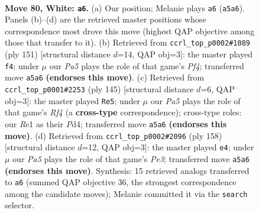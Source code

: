 \documentclass[11pt]{article}
\begin{document}
\clearpage

\begin{figure}[p]\centering
\begin{subfigure}{0.46\textwidth}\centering
\resizebox{\linewidth}{!}{%
\newchessgame
\chessboard[
  setfen={8/7k/1P5n/P7/8/1K6/7r/4R3 w - - 23 80},
  showmover=false,
  pgfstyle=straightmove, color=movearrow, markmove={a5-a6}
]}
\caption{}
\end{subfigure}\hfill
\begin{subfigure}{0.46\textwidth}\centering
\resizebox{\linewidth}{!}{%
\newchessgame
\chessboard[
  setfen={7R/8/6k1/5p2/3P2p1/r7/5K2/5N2 b - - 1 76},
  showmover=false,
  pgfstyle=straightmove, color=movearrow, markmove={f5-f4}
]}
\caption{}
\end{subfigure}
\\[4pt]
\begin{subfigure}{0.46\textwidth}\centering
\resizebox{\linewidth}{!}{%
\newchessgame
\chessboard[
  setfen={8/2k5/8/5rp1/3p4/8/3K4/1RN5 b - - 1 73},
  showmover=false,
  pgfstyle=straightmove, color=movearrow, markmove={f5-e5}
]}
\caption{}
\end{subfigure}\hfill
\begin{subfigure}{0.46\textwidth}\centering
\resizebox{\linewidth}{!}{%
\newchessgame
\chessboard[
  setfen={5r2/8/7R/2k5/1n6/4P3/4K3/8 w - - 14 80},
  showmover=false,
  pgfstyle=straightmove, color=movearrow, markmove={e3-e4}
]}
\caption{}
\end{subfigure}
\caption{\textbf{Move 80, White: \texttt{a6}.} (a) Our position; Melanie plays \texttt{a6} (\texttt{a5a6}). Panels (b)--(d) are the retrieved master positions whose correspondence most drove this move (highest QAP objective among those that transfer to it). (b) Retrieved from \texttt{ccrl\_top\_p0002\#1089} (ply 151) [structural distance $d$=14, QAP obj=3]: the master played \texttt{f4}; under $\mu$ our \emph{Pa5} plays the role of that game's \emph{Pf4}; transferred move \texttt{a5a6} \textbf{(endorses this move)}. (c) Retrieved from \texttt{ccrl\_top\_p0001\#2253} (ply 145) [structural distance $d$=6, QAP obj=3]: the master played \texttt{Re5}; under $\mu$ our \emph{Pa5} plays the role of that game's \emph{Rf4} (a \textbf{cross-type} correspondence); cross-type roles: our \emph{R}e1 as their \emph{P}d4; transferred move \texttt{a5a6} \textbf{(endorses this move)}. (d) Retrieved from \texttt{ccrl\_top\_p0002\#2096} (ply 158) [structural distance $d$=12, QAP obj=3]: the master played \texttt{e4}; under $\mu$ our \emph{Pa5} plays the role of that game's \emph{Pe3}; transferred move \texttt{a5a6} \textbf{(endorses this move)}. Synthesis: 15 retrieved analogs transferred to \texttt{a6} (summed QAP objective 36, the strongest correspondence among the candidate moves); Melanie committed it via the \texttt{search} selector.}
\label{fig:thought-m158}
\end{figure}
\end{document}
